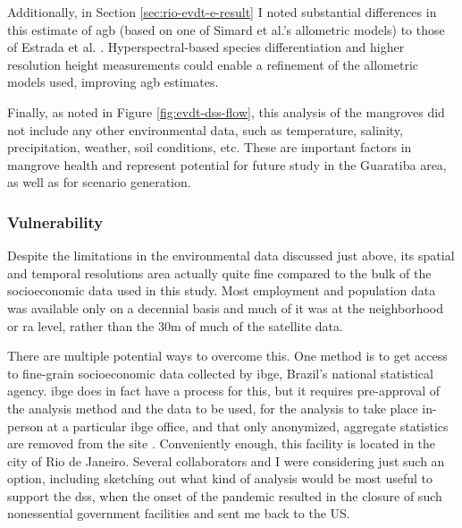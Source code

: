 Additionally, in Section \ref{sec:rio-evdt-e-result} I noted substantial differences in this estimate of \ac{agb} (based on one of Simard et al.'s allometric models) to those of Estrada et al. \cite{estradaEconomicEvaluationCarbon2015}. Hyperspectral-based species differentiation and higher resolution height measurements could enable a refinement of the allometric models used, improving \ac{agb} estimates. 

Finally, as noted in Figure \ref{fig:evdt-dss-flow}, this analysis of the mangroves did not include any other environmental data, such as temperature, salinity, precipitation, weather, soil conditions, etc. These are important factors in mangrove health and represent potential for future study in the Guaratiba area, as well as for scenario generation.

\subsubsection{Vulnerability}

Despite the limitations in the environmental data discussed just above, its spatial and temporal resolutions area actually quite fine compared to the bulk of the socioeconomic data used in this study. Most employment and population data was available only on a decennial basis and much of it was at the neighborhood or \ac{ra} level, rather than the 30m of much of the satellite data. 

There are multiple potential ways to overcome this. One method is to get access to fine-grain socioeconomic data collected by \ac{ibge}, Brazil's national statistical agency. \ac{ibge} does in fact have a process for this, but it requires pre-approval of the analysis method and the data to be used, for the analysis to take place in-person at a particular \ac{ibge} office, and that only anonymized, aggregate statistics are removed from the site \cite{institutobrasileirodegeografiaeestatisticaPedidosComoFazer2014}. Conveniently enough, this facility is located in the city of Rio de Janeiro. Several collaborators and I were considering just such an option, including sketching out what kind of analysis would be most useful to support the \ac{dss}, when the onset of the pandemic resulted in the closure of such nonessential government facilities and sent me back to the US. 

